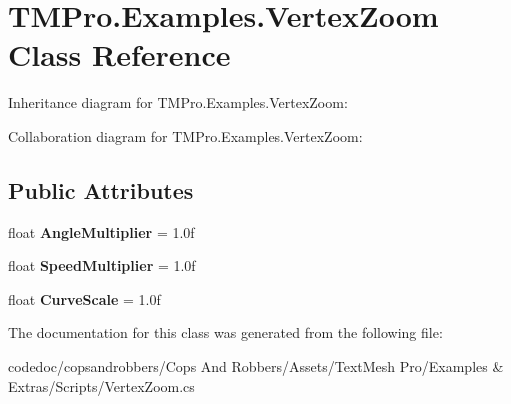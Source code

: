 \hypertarget{classTMPro_1_1Examples_1_1VertexZoom}{}\section{T\+M\+Pro.\+Examples.\+Vertex\+Zoom Class Reference}
\label{classTMPro_1_1Examples_1_1VertexZoom}


Inheritance diagram for T\+M\+Pro.\+Examples.\+Vertex\+Zoom\+:


Collaboration diagram for T\+M\+Pro.\+Examples.\+Vertex\+Zoom\+:
\subsection*{Public Attributes}
\begin{DoxyCompactItemize}
\item 
\mbox{\label{classTMPro_1_1Examples_1_1VertexZoom_aae60c19f9d9352acb093ae262c0759a5}} 
float {\bfseries Angle\+Multiplier} = 1.\+0f
\item 
\mbox{\label{classTMPro_1_1Examples_1_1VertexZoom_a4ba5dc7acf25ea2b07b1b872050b9fa3}} 
float {\bfseries Speed\+Multiplier} = 1.\+0f
\item 
\mbox{\label{classTMPro_1_1Examples_1_1VertexZoom_aaaaaeb0655b1d974a085b416c2e13522}} 
float {\bfseries Curve\+Scale} = 1.\+0f
\end{DoxyCompactItemize}


The documentation for this class was generated from the following file\+:\begin{DoxyCompactItemize}
\item 
codedoc/copsandrobbers/\+Cops And Robbers/\+Assets/\+Text\+Mesh Pro/\+Examples \& Extras/\+Scripts/Vertex\+Zoom.\+cs\end{DoxyCompactItemize}

